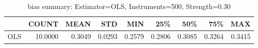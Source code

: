 \begin{table}[ht]
\centering
\caption{bias summary: Estimator=OLS, Instruments=500, Strength=0.30}
\begin{tabular}{lrrrrrrrr}
\toprule
 & COUNT & MEAN & STD & MIN & 25\% & 50\% & 75\% & MAX \\
\midrule
OLS & 10.0000 & 0.3049 & 0.0293 & 0.2579 & 0.2806 & 0.3085 & 0.3264 & 0.3415 \\
\bottomrule
\end{tabular}
\end{table}
